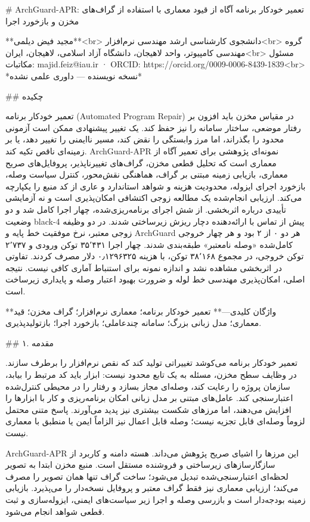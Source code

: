 \documentclass[11pt,a4paper]{article}
\author{مجید فیض دیلمی}\date{}
\begin{document}
\# ArchGuard-APR: تعمیر خودکار برنامه آگاه از قیود معماری با استفاده از گراف‌های مخزن و بازخورد اجرا

**مجید فیض دیلمی**<br>
دانشجوی کارشناسی ارشد مهندسی نرم‌افزار<br>
گروه مهندسی کامپیوتر، واحد لاهیجان، دانشگاه آزاد اسلامی، لاهیجان، ایران<br>
مسئول مکاتبات: majid.feiz@iau.ir · ORCID: https://orcid.org/0009-0006-8439-1839<br>
*نسخه نویسنده — داوری علمی نشده*

\#\# چکیده

تعمیر خودکار برنامه (Automated Program Repair) در مقیاس مخزن باید افزون بر رفتار موضعی، ساختار
سامانه را نیز حفظ کند. یک تغییر پیشنهادی ممکن است آزمونی محدود را بگذراند، اما مرز وابستگی را نقض
کند، مسیر ناایمنی را تغییر دهد، یا بر زمینه‌ای ناقص تکیه کند. ArchGuard-APR نمونه‌ای پژوهشی برای
تعمیر آگاه از معماری است که تحلیل قطعی مخزن، گراف‌های تغییرناپذیر، پروفایل‌های صریح معماری، بازیابی
زمینه مبتنی بر گراف، هماهنگی نقش‌محور، کنترل سیاست وصله، بازخورد اجرای ایزوله، محدودیت هزینه و شواهد
استاندارد و عاری از کد منبع را یکپارچه می‌کند. ارزیابی انجام‌شده یک مطالعه زوجی اکتشافی امکان‌پذیری
است و نه آزمایشی تأییدی درباره اثربخشی. از شش اجرای برنامه‌ریزی‌شده، چهار اجرا کامل شد و دو وضعیت
black-4 پیش از تماس با ارائه‌دهنده دچار ریزش زیرساختی شدند. در دو وظیفه زوجی معتبر، نرخ موفقیت خط
پایه و ArchGuard هر دو ۰ از ۲ بود و هر چهار خروجی کامل‌شده «وصله نامعتبر» طبقه‌بندی شدند. چهار اجرا
۳۵٬۴۳۱ توکن ورودی و ۲٬۷۳۷ توکن خروجی، در مجموع ۳۸٬۱۶۸ توکن، با هزینه ۰٫۱۲۹۶۳۲۵ دلار مصرف کردند.
تفاوتی در اثربخشی مشاهده نشد و اندازه نمونه برای استنباط آماری کافی نیست. نتیجه اصلی، امکان‌پذیری
مهندسی خط لوله و ضرورت بهبود اعتبار وصله و پایداری زیرساخت است.

**واژگان کلیدی—** تعمیر خودکار برنامه؛ معماری نرم‌افزار؛ گراف مخزن؛ قید معماری؛ مدل زبانی بزرگ؛
سامانه چندعاملی؛ بازخورد اجرا؛ بازتولیدپذیری.

\#\# ۱. مقدمه

تعمیر خودکار برنامه می‌کوشد تغییراتی تولید کند که نقص نرم‌افزار را برطرف سازند. در وظایف سطح مخزن،
مسئله به یک تابع محدود نیست: ابزار باید کد مرتبط را بیابد، سازمان پروژه را رعایت کند، وصله‌ای مجاز
بسازد و رفتار را در محیطی کنترل‌شده اعتبارسنجی کند. عامل‌های مبتنی بر مدل زبانی امکان برنامه‌ریزی و
کار با ابزارها را افزایش می‌دهند، اما مرزهای شکست بیشتری نیز پدید می‌آورند. پاسخ متنی محتمل لزوماً
وصله‌ای قابل تجزیه نیست؛ وصله قابل اعمال نیز الزاماً ایمن یا منطبق با معماری نیست.

ArchGuard-APR این مرزها را اشیای صریح پژوهش می‌داند. هسته دامنه و کاربرد از سازگارسازهای زیرساختی و
فروشنده مستقل است. منبع مخزن ابتدا به تصویر لحظه‌ای اعتبارسنجی‌شده تبدیل می‌شود؛ ساخت گراف تنها همان
تصویر را مصرف می‌کند؛ ارزیابی معماری نیز فقط گراف معتبر و پروفایل نسخه‌دار را می‌پذیرد. بازیابی زمینه
بودجه‌دار است و بازرسی وصله و اجرا زیر سیاست‌های ایمنی، ایزوله‌سازی و ثبت قطعی شواهد انجام می‌شود.
\end{document}

